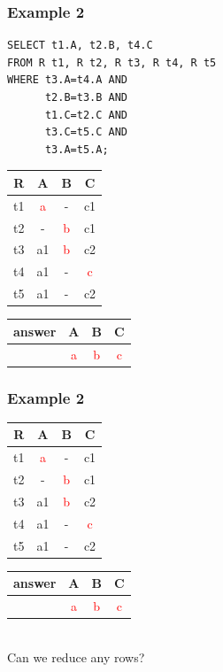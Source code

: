 \documentclass{beamer}
\begin{document}
\begin{frame}[fragile]
  \frametitle{Example 2}
\begin{verbatim}  
SELECT t1.A, t2.B, t4.C
FROM R t1, R t2, R t3, R t4, R t5
WHERE t3.A=t4.A AND
      t2.B=t3.B AND
      t1.C=t2.C AND
      t3.C=t5.C AND
      t3.A=t5.A;
\end{verbatim} 
  \begin{tabular}{ c | c c c}
  R & A & B & C \\
  \hline
  t1 & \textcolor{red}{a}  & -  & c1 \\
  t2 & -  & \textcolor{red}{b}  & c1 \\
  t3 & a1 & \textcolor{red}{b} & c2 \\
  t4 & a1 & - & \textcolor{red}{c} \\
  t5 & a1 & - & c2 \\
  \end{tabular}
  \begin{tabular}{ c | c c c}
  answer & A & B & C \\
  \hline
   & \textcolor{red}{a}& \textcolor{red}{b}& \textcolor{red}{c}\\
  \end{tabular}
\end{frame}

\begin{frame}
  \frametitle{Example 2}
  \begin{tabular}{ c | c c c}
  R & A & B & C \\
  \hline
  t1 & \textcolor{red}{a}  & -  & c1 \\
  t2 & -  & \textcolor{red}{b}  & c1 \\
  t3 & a1 & \textcolor{red}{b} & c2 \\
  t4 & a1 & - & \textcolor{red}{c} \\
  t5 & a1 & - & c2 \\
  \end{tabular}
  \begin{tabular}{ c | c c c}
  answer & A & B & C \\
  \hline
   & \textcolor{red}{a}& \textcolor{red}{b}& \textcolor{red}{c}\\
  \end{tabular}
  \hfill \\
  Can we reduce any rows?
\end{frame}
\end{document}
